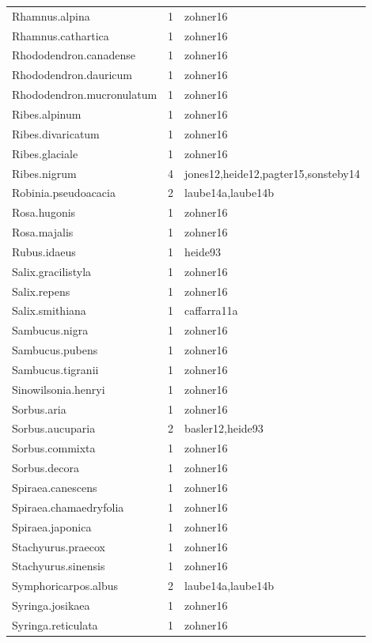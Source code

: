 \documentclass{article}
\begin{document}
\begin{footnotesize}
\begin{table}[ht]
\begin{tabular}{|p{}|p{}|p{}|}
  Rhamnus.alpina &   1 & zohner16 \\ 
  Rhamnus.cathartica &   1 & zohner16 \\ 
  Rhododendron.canadense &   1 & zohner16 \\ 
  Rhododendron.dauricum &   1 & zohner16 \\ 
  Rhododendron.mucronulatum &   1 & zohner16 \\ 
  Ribes.alpinum &   1 & zohner16 \\ 
  Ribes.divaricatum &   1 & zohner16 \\ 
  Ribes.glaciale &   1 & zohner16 \\ 
  Ribes.nigrum &   4 & jones12,heide12,pagter15,sonsteby14 \\ 
  Robinia.pseudoacacia &   2 & laube14a,laube14b \\ 
  Rosa.hugonis &   1 & zohner16 \\ 
  Rosa.majalis &   1 & zohner16 \\ 
  Rubus.idaeus &   1 & heide93 \\ 
  Salix.gracilistyla &   1 & zohner16 \\ 
  Salix.repens &   1 & zohner16 \\ 
  Salix.smithiana &   1 & caffarra11a \\ 
  Sambucus.nigra &   1 & zohner16 \\ 
  Sambucus.pubens &   1 & zohner16 \\ 
  Sambucus.tigranii &   1 & zohner16 \\ 
  Sinowilsonia.henryi &   1 & zohner16 \\ 
  Sorbus.aria &   1 & zohner16 \\ 
  Sorbus.aucuparia &   2 & basler12,heide93 \\ 
  Sorbus.commixta &   1 & zohner16 \\ 
  Sorbus.decora &   1 & zohner16 \\ 
  Spiraea.canescens &   1 & zohner16 \\ 
  Spiraea.chamaedryfolia &   1 & zohner16 \\ 
  Spiraea.japonica &   1 & zohner16 \\ 
  Stachyurus.praecox &   1 & zohner16 \\ 
  Stachyurus.sinensis &   1 & zohner16 \\ 
  Symphoricarpos.albus &   2 & laube14a,laube14b \\ 
  Syringa.josikaea &   1 & zohner16 \\ 
  Syringa.reticulata &   1 & zohner16 \\ 

\end{tabular}
\end{table}
\end{footnotesize}
\end{document}
